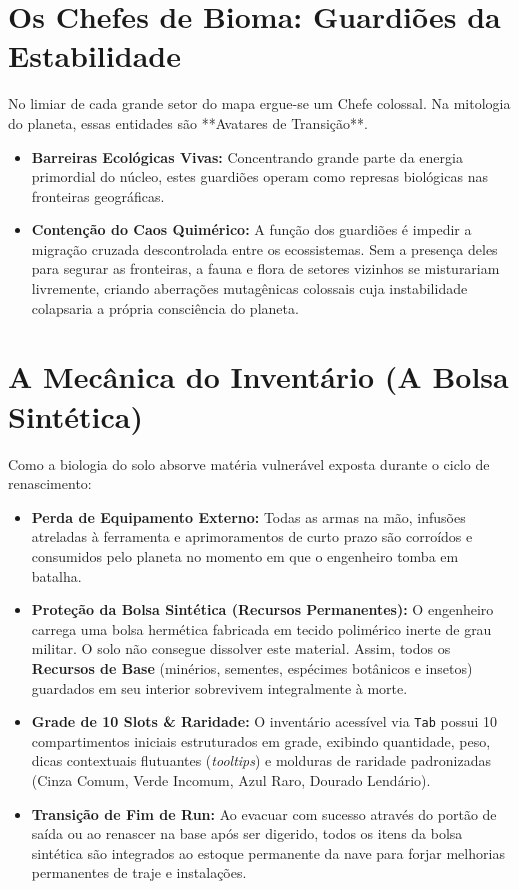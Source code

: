\documentclass[a4paper,12pt]{report}
\begin{document}
\section{Os Chefes de Bioma: Guardiões da Estabilidade}
No limiar de cada grande setor do mapa ergue-se um Chefe colossal. Na mitologia do planeta, essas entidades são **Avatares de Transição**.
\begin{itemize}
    \item \textbf{Barreiras Ecológicas Vivas:} Concentrando grande parte da energia primordial do núcleo, estes guardiões operam como represas biológicas nas fronteiras geográficas.
    \item \textbf{Contenção do Caos Quimérico:} A função dos guardiões é impedir a migração cruzada descontrolada entre os ecossistemas. Sem a presença deles para segurar as fronteiras, a fauna e flora de setores vizinhos se misturariam livremente, criando aberrações mutagênicas colossais cuja instabilidade colapsaria a própria consciência do planeta.
\end{itemize}

\section{A Mecânica do Inventário (A Bolsa Sintética)}
Como a biologia do solo absorve matéria vulnerável exposta durante o ciclo de renascimento:
\begin{itemize}
    \item \textbf{Perda de Equipamento Externo:} Todas as armas na mão, infusões atreladas à ferramenta e aprimoramentos de curto prazo são corroídos e consumidos pelo planeta no momento em que o engenheiro tomba em batalha.
    \item \textbf{Proteção da Bolsa Sintética (Recursos Permanentes):} O engenheiro carrega uma bolsa hermética fabricada em tecido polimérico inerte de grau militar. O solo não consegue dissolver este material. Assim, todos os \textbf{Recursos de Base} (minérios, sementes, espécimes botânicos e insetos) guardados em seu interior sobrevivem integralmente à morte.
    \item \textbf{Grade de 10 Slots \& Raridade:} O inventário acessível via \texttt{Tab} possui 10 compartimentos iniciais estruturados em grade, exibindo quantidade, peso, dicas contextuais flutuantes (\textit{tooltips}) e molduras de raridade padronizadas (Cinza Comum, Verde Incomum, Azul Raro, Dourado Lendário).
    \item \textbf{Transição de Fim de Run:} Ao evacuar com sucesso através do portão de saída ou ao renascer na base após ser digerido, todos os itens da bolsa sintética são integrados ao estoque permanente da nave para forjar melhorias permanentes de traje e instalações.
\end{itemize}
\end{document}
